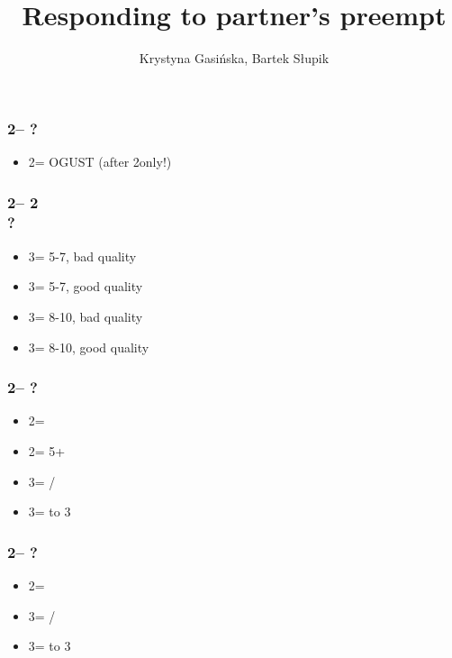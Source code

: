 \documentclass[12pt, a4paper]{article}
\title{Responding to partner's preempt}
\author{Krystyna Gasińska, Bartek Słupik}
\begin{document}
\maketitle


\subsubsection*{2\diams -- ?}
\begin{itemize}
    \item 2\nt = OGUST (after 2\diams only!)
\end{itemize}

\subsubsection*{2\diams -- 2\nt \\ ?}
\begin{itemize}
    \item 3\clubs = 5-7, bad \diams quality
    \item 3\diams = 5-7, good \diams quality
    \item 3\hearts = 8-10, bad \diams quality
    \item 3\spades = 8-10, good \diams quality
\end{itemize}

\subsubsection*{2\hearts -- ?}
\begin{itemize}
    \item 2\spades = \lsf
    \item 2\nt = 5+\spades
    \item 3\clubs = \clubs/\diams \gf
    \item 3\diams = \inv to 3\nt
\end{itemize}

\subsubsection*{2\spades -- ?}
\begin{itemize}
    \item 2\nt = \lsf
    \item 3\clubs = \clubs/\diams \gf
    \item 3\diams = \inv to 3\nt
\end{itemize}
\end{document}
